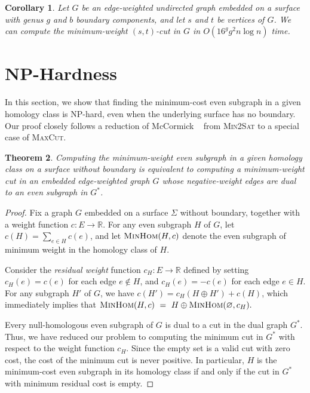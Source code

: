 \documentclass[11pt,twoside]{article}
\def\Real{\mathbb{R}}
\newtheorem{theorem}{Theorem}[section]
\newtheorem{corollary}[theorem]{Corollary}
\begin{document}
{\begin{corollary}
\label{cor:mincut}
Let $G$ be an edge-weighted undirected graph embedded on a surface with genus $g$ and $b$ boundary components, and let $s$ and $t$ be vertices of $G$.  We can compute the minimum-weight $(s,t)$-cut in $G$ in $O(16^g g^2 n \log n)$ time.
\end{corollary}

\section{{NP}-Hardness}
\label{S:NPhard}

In this section, we show that finding the minimum-cost even subgraph in a given homology class is {NP}-hard, even when the underlying surface has no boundary.  Our proof closely follows a reduction of McCormick \etal~\cite{mrr-edofm-03} from \textsc{Min2Sat} to a special case of \textsc{MaxCut}.

\begin{theorem}
Computing the minimum-weight even subgraph in a given homology class on a surface without boundary is equivalent to computing a minimum-weight cut in an embedded edge-weighted graph $G$ whose negative-weight edges are dual to an even subgraph in $G^*$.
\end{theorem}

\begin{proof}
Fix a graph $G$ embedded on a surface $\Sigma$ without boundary, together with a weight function $c\colon E\to \Real$.  For any even subgraph $H$ of $G$, let $c(H) = \sum_{e\in H} c(e)$, and let $\textsc{MinHom}(H,c)$ denote the even subgraph of minimum weight in the homology class of $H$.

Consider the \emph{residual weight} function $c_H\colon E\to \Real$ defined by setting $c_H(e) = c(e)$ for each edge $e\not\in H$, and $c_H(e) = -c(e)$ for each edge $e\in H$.  For any subgraph $H'$ of $G$, we have $c(H') = c_H(H\oplus H') + c(H)$, which immediately implies that
\(
    \textsc{MinHom}(H,c) ~=~
    H \oplus \textsc{MinHom}(\varnothing, c_H).
\)

Every null-homologous even subgraph of $G$ is dual to a cut in the dual graph $G^*$.  Thus, we have reduced our problem to computing the minimum cut in $G^*$ with respect to the weight function $c_H$.  Since the empty set is a valid cut with zero cost, the cost of the minimum cut is never positive.  In particular, $H$ is the minimum-cost even subgraph in its homology class if and only if the cut in $G^*$ with minimum residual cost is empty.


\end{proof}}
\end{document}
